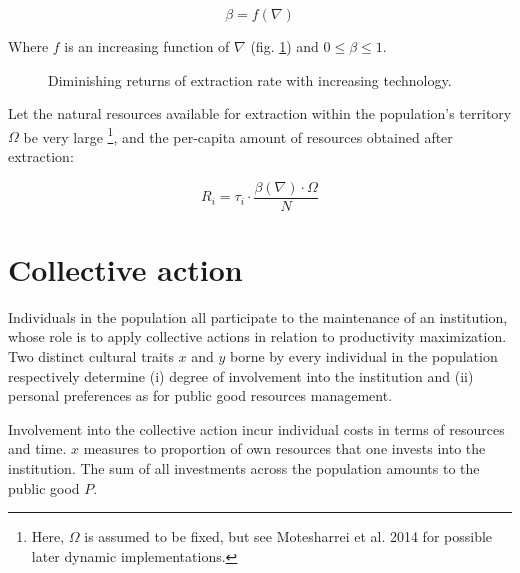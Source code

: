 \documentclass[a4paper]{article}
\begin{document}
\begin{equation}
\beta = f\left(\nabla\right)
\end{equation}
 
Where $f$ is an increasing function of $\nabla$ (fig. \ref{fig:betafunc}) and $0\le\beta\le1$.

\begin{figure}[!htbp]
	\begin{center}
	\end{center}
	\caption{Diminishing returns of extraction rate with increasing technology.}
	\label{fig:betafunc}
\end{figure} 

Let the natural resources available for extraction within the population's territory $\Omega$ be very large \footnote{Here, $\Omega$ is assumed to be fixed, but see Motesharrei et al. 2014 for possible later dynamic implementations.}, and the per-capita amount of resources obtained after extraction:

\begin{equation} \label{eq:resources}
	R_i = \tau_i\cdot\frac{\beta\left(\nabla\right)\cdot\Omega}{N}
\end{equation}

\section{Collective action}
\label{sec:collact}

Individuals in the population all participate to the maintenance of an institution, whose role is to apply collective actions in relation to productivity maximization. Two distinct cultural traits $x$ and $y$ borne by every individual in the population respectively determine (i) degree of involvement into the institution and (ii) personal preferences as for public good resources management.     

Involvement into the collective action incur individual costs in terms of resources and time. $x$ measures to proportion of own resources that one invests into the institution. The sum of all investments across the population amounts to the public good $P$. 
\end{document}
